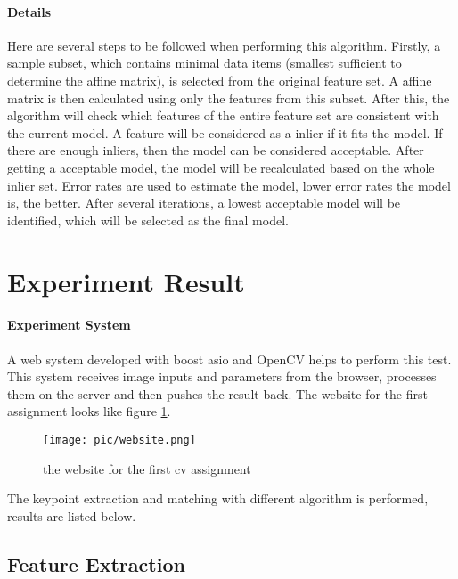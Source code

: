\documentclass[paper=a4, fontsize=11pt]{scrartcl} %
\numberwithin{equation}{section} %
\numberwithin{figure}{section} %
\numberwithin{table}{section} %
\begin{document}
\paragraph{Details}
Here are several steps to be followed when performing this algorithm. 
Firstly, a sample subset, which contains minimal data items (smallest sufficient to determine the affine matrix), is selected from the original feature set.
A affine matrix is then calculated using only the features from this subset.
After this, the algorithm will check which features of the entire feature set are consistent with the current model.
A feature will be considered as a inlier if it fits the model.
If there are enough inliers, then the model can be considered acceptable.
After getting a acceptable model, the model will be recalculated based on the whole inlier set.
Error rates are used to estimate the model, lower error rates the model is, the better.
After several iterations, a lowest acceptable model will be identified, which will be selected as the final model.

\section{Experiment Result}

\paragraph{Experiment System}
A web system developed with boost asio and OpenCV helps to perform this test. 
This system receives image inputs and parameters from the browser, processes them on the server and then pushes the result back.
The website for the first assignment looks like figure \ref{fig:website}.

\begin{figure}[htbp]
\centering
\texttt{[image: pic/website.png]}
\caption{the website for the first cv assignment}
\label{fig:website}
\end{figure}

The keypoint extraction and matching with different algorithm is performed, results are listed below. 

\subsection{Feature Extraction}
\end{document}
